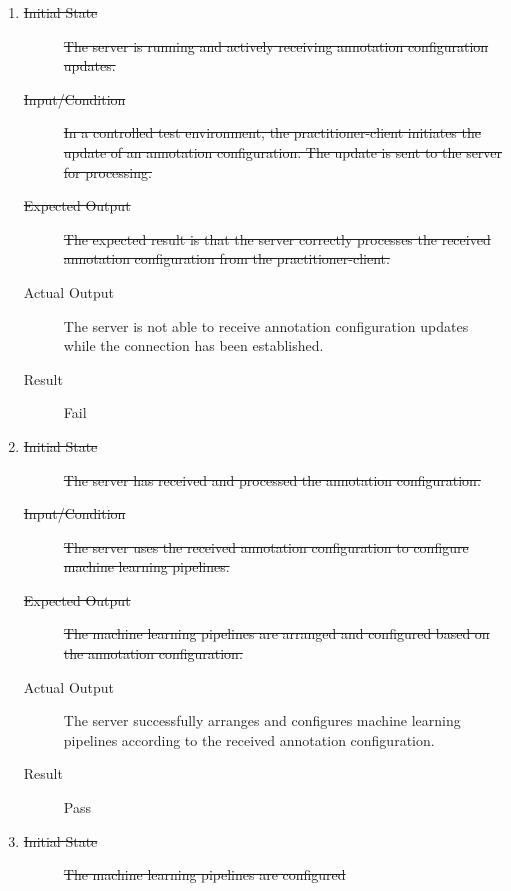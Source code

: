 \documentclass[12pt, titlepage]{article}
\begin{document}
\begin{enumerate}[FR-T1]
\item \label{FRT7}
  \begin{description}
  \item[\sout{Initial State}] \sout{The server is running and actively receiving
      annotation configuration updates.}
  \item[\sout{Input/Condition}] \sout{In a controlled test environment, the
      practitioner-client initiates the update of an annotation configuration.
      The update is sent to the server for processing.}
  \item[\sout{Expected Output}] \sout{The expected result is that the server
      correctly processes the received annotation configuration from the
      practitioner-client.}
  \item[Actual Output] The server is not able to receive annotation configuration
    updates while the connection has been established.
  \item[Result] Fail
  \end{description}
\item \label{FRT8}
  \begin{description}
  \item[\sout{Initial State}] \sout{The server has received and processed the
      annotation configuration.}
  \item[\sout{Input/Condition}] \sout{The server uses the received annotation
      configuration to configure machine learning pipelines.}
  \item[\sout{Expected Output}] \sout{The machine learning pipelines are arranged
      and configured based on the annotation configuration.}
  \item[Actual Output] The server successfully arranges and configures machine
    learning pipelines according to the received annotation configuration.
  \item[Result] Pass
  \end{description}
\item \label{FRT9}
  \begin{description}
  \item[\sout{Initial State}] \sout{The machine learning pipelines are configured
}
\end{description}
\end{enumerate}
\end{document}
